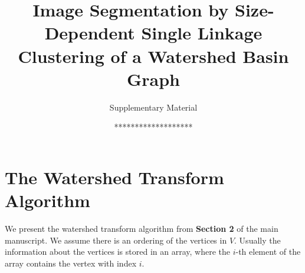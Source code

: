\documentclass{llncs}
\begin{document}
\title{Image Segmentation by Size-Dependent Single Linkage
  Clustering of a Watershed Basin Graph}

\subtitle{Supplementary Material}

\author{{*}{*}{*}{*}{*}{*}{*}{*}{*}{*}{*}{*}{*}{*}{*}{*}{*}{*}{*}}


\institute{{*}{*}{*}{*}{*}{*}{*}{*}{*}{*}{*}\\
\texttt{{*}{*}{*}{*}{*}{*}{*}{*}{*}}\\
{*}{*}{*}{*}{*}{*}{*}{*}{*}{*}{*}\\
\texttt{{*}{*}{*}{*}{*}{*}{*}{*}{*}}}

\maketitle


\section{The Watershed Transform Algorithm}\label{sec:Introduction}

We present the watershed transform algorithm from {\bf Section 2} of the main manuscript. We assume there is an ordering of the vertices in $V$. Usually the information about the vertices is stored in an array, where the $i$-th element of the array contains the vertex with index $i$.
\end{document}
